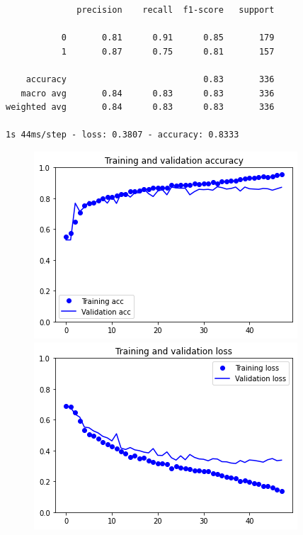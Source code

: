 \documentclass{article}
\begin{document}
\begin {verbatim}
              precision    recall  f1-score   support

           0       0.81      0.91      0.85       179
           1       0.87      0.75      0.81       157

    accuracy                           0.83       336
   macro avg       0.84      0.83      0.83       336
weighted avg       0.84      0.83      0.83       336

1s 44ms/step - loss: 0.3807 - accuracy: 0.8333

\end{verbatim}

\begin{figure}[h]
    \centering
    \begin{minipage}{0.45\textwidth}
        \centering
        \includegraphics[scale=0.46]{./img/scratchValDrop.png}
    \end{minipage}\hfill
    \begin{minipage}{0.45\textwidth}
        \centering
        \includegraphics[scale=0.46]{./img/scratchLossDrop.png}
    \end{minipage}
\end{figure}
\end{document}
